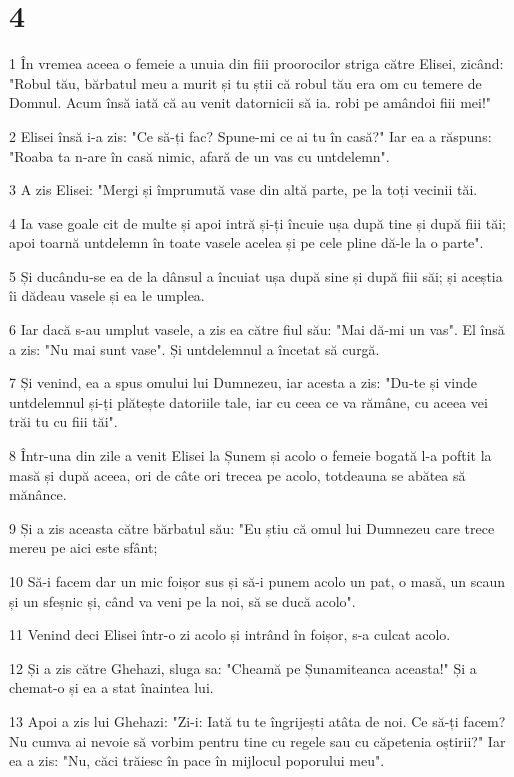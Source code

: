 \chapter{4}

\par 1 În vremea aceea o femeie a unuia din fiii proorocilor striga către Elisei, zicând: "Robul tău, bărbatul meu a murit și tu știi că robul tău era om cu temere de Domnul. Acum însă iată că au venit datornicii să ia. robi pe amândoi fiii mei!"
\par 2 Elisei însă i-a zis: "Ce să-ți fac? Spune-mi ce ai tu în casă?" Iar ea a răspuns: "Roaba ta n-are în casă nimic, afară de un vas cu untdelemn".
\par 3 A zis Elisei: "Mergi și împrumută vase din altă parte, pe la toți vecinii tăi.
\par 4 Ia vase goale cit de multe și apoi intră și-ți încuie ușa după tine și după fiii tăi; apoi toarnă untdelemn în toate vasele acelea și pe cele pline dă-le la o parte".
\par 5 Și ducându-se ea de la dânsul a încuiat ușa după sine și după fiii săi; și aceștia îi dădeau vasele și ea le umplea.
\par 6 Iar dacă s-au umplut vasele, a zis ea către fiul său: "Mai dă-mi un vas". El însă a zis: "Nu mai sunt vase". Și untdelemnul a încetat să curgă.
\par 7 Și venind, ea a spus omului lui Dumnezeu, iar acesta a zis: "Du-te și vinde untdelemnul și-ți plătește datoriile tale, iar cu ceea ce va rămâne, cu aceea vei trăi tu cu fiii tăi".
\par 8 Într-una din zile a venit Elisei la Șunem și acolo o femeie bogată l-a poftit la masă și după aceea, ori de câte ori trecea pe acolo, totdeauna se abătea să mănânce.
\par 9 Și a zis aceasta către bărbatul său: "Eu știu că omul lui Dumnezeu care trece mereu pe aici este sfânt;
\par 10 Să-i facem dar un mic foișor sus și să-i punem acolo un pat, o masă, un scaun și un sfeșnic și, când va veni pe la noi, să se ducă acolo".
\par 11 Venind deci Elisei într-o zi acolo și intrând în foișor, s-a culcat acolo.
\par 12 Și a zis către Ghehazi, sluga sa: "Cheamă pe Șunamiteanca aceasta!" Și a chemat-o și ea a stat înaintea lui.
\par 13 Apoi a zis lui Ghehazi: "Zi-i: Iată tu te îngrijești atâta de noi. Ce să-ți facem? Nu cumva ai nevoie să vorbim pentru tine cu regele sau cu căpetenia oștirii?" Iar ea a zis: "Nu, căci trăiesc în pace în mijlocul poporului meu".
